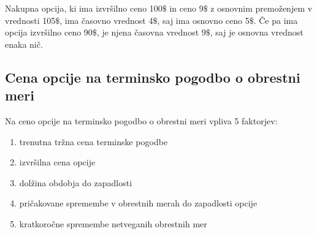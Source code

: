 \documentclass[a4paper]{article}
\begin{document}
Nakupna opcija, ki ima izvršilno ceno 100$\$$ in ceno 9$\$$ z osnovnim premoženjem v vrednosti 105$\$$, ima časovno vrednost 4$\$$,
saj ima osnovno ceno 5$\$$. Če pa ima opcija izvršilno ceno 90$\$$, je njena časovna vrednost 9$\$$, saj je osnovna vrednost enaka nič.
\pagebreak
\subsection{Cena opcije na terminsko pogodbo o obrestni meri}
Na ceno opcije na terminsko pogodbo o obrestni meri vpliva 5 faktorjev:
\begin{enumerate}
    \item trenutna tržna cena terminske pogodbe
    \item izvršilna cena opcije
    \item dolžina obdobja do zapadlosti
    \item pričakovane spremembe v obrestnih merah do zapadlosti opcije
    \item kratkoročne spremembe netveganih obrestnih mer
\end{enumerate}
\end{document}
